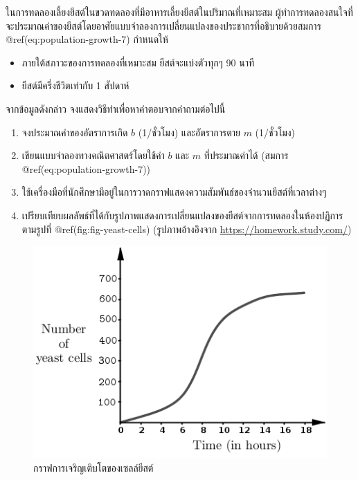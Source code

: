 \documentclass[
]{book}
\begin{document}
\label{exm3}
ในการทดลองเลี้ยงยีสต์ในขวดทดลองที่มีอาหารเลี้ยงยีสต์ในปริมาณที่เหมาะสม
ผู้ทำการทดลองสนใจที่จะประมาณค่าของยีสต์โดยอาศัยแบบจำลองการเปลี่ยนแปลงของประชากรที่อธิบายด้วยสมการ
@ref(eq:population-growth-7) กำหนดให้

\begin{itemize}
\item
  ภายใต้สภาวะของการทดลองที่เหมาะสม ยีสต์จะแบ่งตัวทุกๆ 90 นาที
\item
  ยีสต์มีครึ่งชีวิตเท่ากับ 1 สัปดาห์
\end{itemize}

จากข้อมูลดังกล่าว จงแสดงวิธีทำเพื่อหาคำตอบจากคำถามต่อไปนี้

\begin{enumerate}
\def\labelenumi{\arabic{enumi}.}
\item
  จงประมาณค่าของอัตราการเกิด \(b\) (1/ชั่วโมง) และอัตราการตาย \(m\) (1/ชั่วโมง)
\item
  เขียนแบบจำลองทางคณิตศาสตร์โดยใช้ค่า \(b\) และ \(m\) ที่ประมาณค่าได้ (สมการ
  @ref(eq:population-growth-7))
\item
  ใช้เครื่องมือที่นักศึกษามีอยู่ในการวาดกราฟแสดงความสัมพันธ์ของจำนวนยีสต์ที่เวลาต่างๆ
\item
  เปรียบเทียบผลลัพธ์ที่ได้กับรูปภาพแสดงการเปลี่ยนแปลงของยีสต์จากการทดลองในห้องปฏิการ
  ตามรูปที่ @ref(fig:fig-yeast-cells) (รูปภาพอ้างอิงจาก
  \href{https://homework.study.com/explanation/a-graph-of-a-population-of-yeast-cells-in-a-new-laboratory-culture-as-a-function-of-time-is-shown-a-describe-how-the-rate-of-population-increase-varies-b-when-is-this-rate-highest-c-on-what-intervals-is-the-population-function-concave-upward-or-d.html}{https://homework.study.com/})
\end{enumerate}

\begin{figure}

{\centering \includegraphics[width=0.5\linewidth]{images/fig-yeast-cells} 

}

\caption{กราฟการเจริญเติบโตของเซลล์ยีสต์}\label{fig:fig-yeast-cells}
\end{figure}
\end{document}
